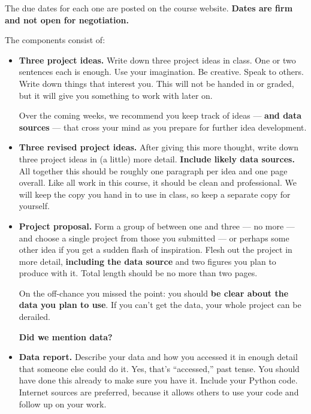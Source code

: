 \documentclass[11pt]{article}
\begin{document}
The due dates for each one are posted on the course website.
{\bf Dates are firm and not open for negotiation.}


The components consist of:
\begin{itemize}

\item {\bf Three project ideas.}
Write down three project ideas in class.
One or two sentences each is enough.
Use your imagination.  Be creative.  Speak to others.
Write down things that interest you.
This will not be handed in or graded, but it will give you something to work with later on.

Over the coming weeks, we recommend you keep track of ideas --- {\bf and data sources\/}
--- that cross
your mind as you prepare for further idea development.


\item {\bf Three revised project ideas.}
After giving this more thought, write down three project ideas in (a little) more detail.
{\bf Include likely data sources.}
All together this should be roughly one paragraph per idea and one page overall.
Like all work in this course, it should be clean and professional.
We will keep the copy you hand in to use in class, so keep a separate copy for yourself.

\item{\bf Project proposal.}
Form a group of between one and three --- no more ---
and choose a single project from those you submitted ---
or perhaps some other idea if you get a sudden flash of inspiration.
Flesh out the project in more detail, {\bf including the data source\/} and
two figures you plan to produce with it.
Total length should be no more than two pages.

On the off-chance you missed the point:  you should {\bf be clear about the data you plan to use\/}.
If you can't get the data, your whole project can be derailed.

{\bf Did we mention data?}

\item {\bf Data report.}
Describe your data and how you accessed it in enough detail that someone else could do it.
Yes, that's ``accessed,'' past tense.  You should have done this already to make sure you have it.  
Include your Python code.  %
Internet sources are preferred, because it allows others to use your code and
follow up on your work.


\end{itemize}
\end{document}

